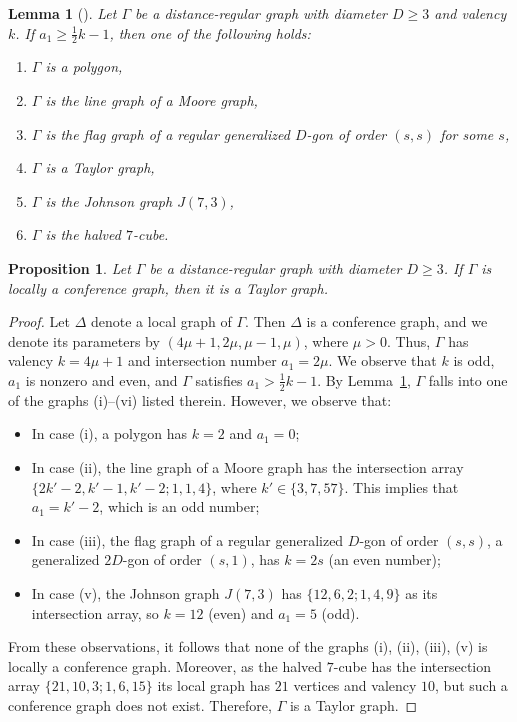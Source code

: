 \documentclass[11pt]{article}
\newtheorem{lemma}[theo]{Lemma}
\newtheorem{prop}[theo]{Proposition}
\theoremstyle{definition}
\numberwithin{equation}{section}
\numberwithin{equation}{section}
\begin{document}
\begin{lemma}[{\cite[Theorem 16]{KP2012}}]\label{a_1 bound}
Let $\Gamma$ be a distance-regular graph with diameter $D \geqslant 3$ and valency $k$. If $a_1 \geqslant \frac{1}{2}k -1$, then one of the following holds:
\begin{enumerate}[\normalfont(i)]
  \item $\Gamma$ is a polygon,
  \item $\Gamma$ is the line graph of a Moore graph,
  \item $\Gamma$ is the flag graph of a regular generalized $D$-gon of order $(s,s)$ for some $s$,
  \item $\Gamma$ is a Taylor graph,
  \item $\Gamma$ is the Johnson graph $J(7,3)$,
  \item $\Gamma$ is the halved $7$-cube.
\end{enumerate}
\end{lemma}



\begin{prop}\label{conference}
Let $\Gamma$ be a distance-regular graph with diameter $D \geqslant 3$. 
If $\Gamma$ is locally a conference graph, then it is a Taylor graph.
\end{prop}
\begin{proof}
Let $\Delta$ denote a local graph of $\Gamma$. 
Then $\Delta$ is a conference graph, and we denote its parameters by $(4\mu +1, 2\mu, \mu-1,\mu)$, where $\mu > 0$.
Thus, $\Gamma$ has valency $k=4\mu+1$ and intersection number $a_1=2\mu$.
We observe that $k$ is odd, $a_1$ is nonzero and even, and $\Gamma$ satisfies $a_1 > \frac{1}{2}k -1$.
By Lemma~\ref{a_1 bound}, $\Gamma$ falls into one of the graphs (i)--(vi) listed therein. 
However, we observe that:
\begin{itemize}\setlength\itemsep{0pt}
\item In case (i), a polygon has $k=2$ and $a_1=0$;
\item In case (ii), the line graph of a Moore graph has the intersection array $\{2k'-2,k'-1,k'-2;1,1,4\}$, where $k' \in \{3,7,57\}$.
This implies that $a_1 = k'-2$, which is an odd number;
\item In case (iii), the flag graph of a regular generalized $D$-gon of order $(s,s)$, a generalized $2D$-gon of order $(s,1)$, has $k= 2s$ (an even number);
\item In case (v), the Johnson graph $J(7,3)$ has $\{12,6,2;1,4,9\}$ as its intersection array, so $k=12$ (even) and $a_1=5$ (odd).
\end{itemize}
From these observations, it follows that none of the graphs (i), (ii), (iii), (v) is locally a conference graph.
Moreover, as the halved $7$-cube has the intersection array $\{21,10,3; 1,6,15\}$ its local graph has $21$ vertices and valency $10$, but such a conference graph does not exist.
Therefore, $\Gamma$ is a Taylor graph.
\end{proof}
\end{document}
